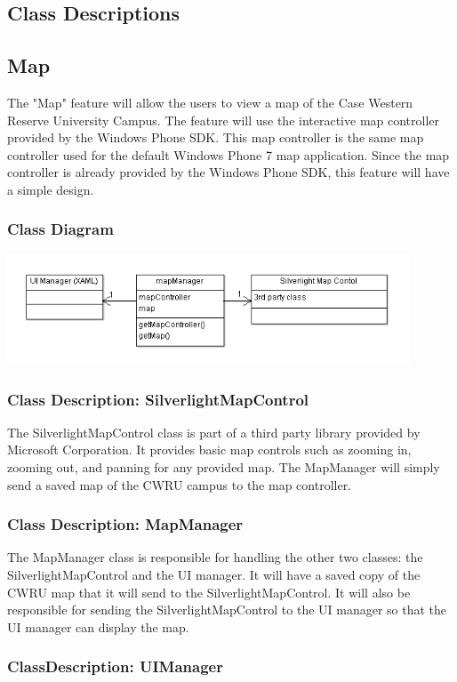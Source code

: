 \documentclass[pdftex,12pt,letter]{article}
\begin{document}
\subsection{Class Descriptions}

\subsection{Map}
The "Map" feature will allow the users to view a map of the Case Western Reserve University Campus. The feature will use the interactive map controller provided by the Windows Phone SDK. This map controller is the same map controller used for the default Windows Phone 7 map application. Since the map controller is already provided by the Windows Phone SDK, this feature will have a simple design.
\subsubsection{Class Diagram}
\includegraphics[width=120mm]{MapCD.png}
\subsubsection{Class Description: SilverlightMapControl}
The SilverlightMapControl class is part of a third party library provided by Microsoft Corporation. It provides basic map controls such as zooming in, zooming out, and panning for any provided map. The MapManager will simply send a saved map of the CWRU campus to the map controller.
\subsubsection{Class Description: MapManager}
The MapManager class is responsible for handling the other two classes: the SilverlightMapControl and the UI manager. It will have a saved copy of the CWRU map that it will send to the SilverlightMapControl. It will also be responsible for sending the SilverlightMapControl to the UI manager so that the UI manager can display the map.
\subsubsection{ClassDescription: UIManager}
\end{document}
